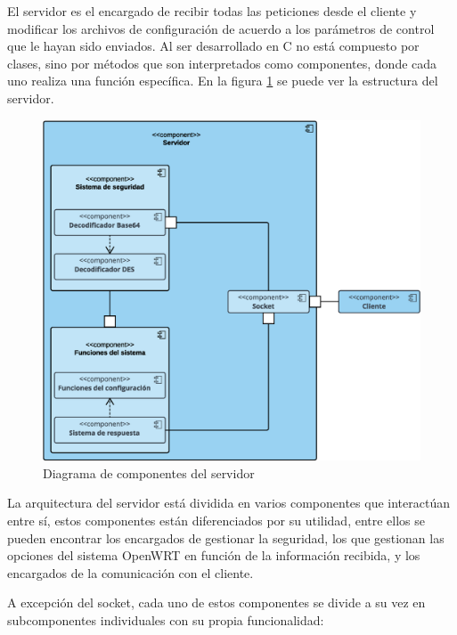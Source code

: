 \documentclass[12pt]{article}
\begin{document}
            El servidor es el encargado de recibir todas las peticiones desde el cliente y modificar los archivos de configuración de acuerdo a los parámetros de control que le hayan sido enviados. Al ser desarrollado en C no está compuesto por clases, sino por métodos que son interpretados como componentes, donde cada uno realiza una función específica. En la figura \ref{fig:server_diagram} se puede ver la estructura del servidor.

            \begin{figure}[h!]
            \centering
                \includegraphics[scale=0.4]{server_diagram.eps}
                \caption{Diagrama de componentes del servidor}
                \label{fig:server_diagram}
            \end{figure}

            La arquitectura del servidor está dividida en varios componentes que interactúan entre sí, estos componentes están diferenciados por su utilidad, entre ellos se pueden encontrar los encargados de gestionar la seguridad, los que gestionan las opciones del sistema OpenWRT en función de la información recibida, y los encargados de la comunicación con el cliente.

            A excepción del socket, cada uno de estos componentes se divide a su vez en subcomponentes individuales con su propia funcionalidad:
\end{document}

